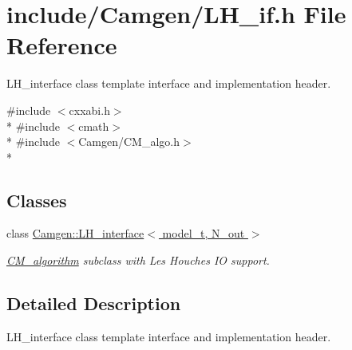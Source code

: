 \hypertarget{a00678}{}\section{include/\+Camgen/\+L\+H\+\_\+if.h File Reference}
\label{a00678}


L\+H\+\_\+interface class template interface and implementation header.  


{\ttfamily \#include $<$cxxabi.\+h$>$}\\*
{\ttfamily \#include $<$cmath$>$}\\*
{\ttfamily \#include $<$Camgen/\+C\+M\+\_\+algo.\+h$>$}\\*
\subsection*{Classes}
\begin{DoxyCompactItemize}
\item 
class \hyperlink{a00326}{Camgen\+::\+L\+H\+\_\+interface$<$ model\+\_\+t, N\+\_\+out $>$}
\begin{DoxyCompactList}\small\item\em \hyperlink{a00065}{C\+M\+\_\+algorithm} subclass with Les Houches I\+O support. \end{DoxyCompactList}\end{DoxyCompactItemize}


\subsection{Detailed Description}
L\+H\+\_\+interface class template interface and implementation header. 

